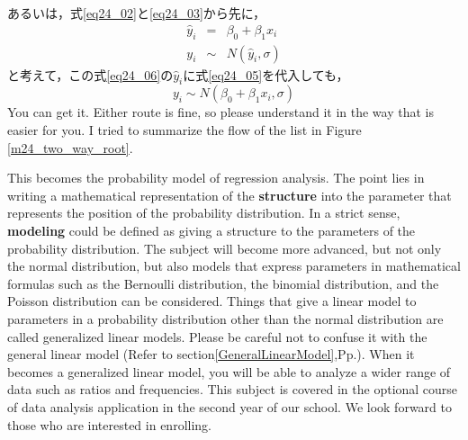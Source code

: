\documentclass{ltjbook}
\begin{document}
あるいは，式\ref{eq24_02}と\ref{eq24_03}から先に，
\begin{eqnarray}
	\hat{y}_i &=& \beta_0 + \beta_1 x_i \label{eq24_05}\\
	y_i &\sim& N(\hat{y}_i,\sigma) \label{eq24_06}
\end{eqnarray}
と考えて，この式\ref{eq24_06}の$\hat{y}_i$に式\ref{eq24_05}を代入しても，
\[ y_i \sim N(\beta_0 + \beta_1x_i, \sigma) \]
You can get it. Either route is fine, so please understand it in the way that is easier for you. I tried to summarize the flow of the list in Figure \ref{m24_two_way_root}.



This becomes the probability model of regression analysis.
The point lies in writing a mathematical representation of the \textbf{structure} into the parameter that represents the position of the probability distribution. In a strict sense, \textbf{modeling} could be defined as giving a structure to the parameters of the probability distribution.
The subject will become more advanced, but not only the normal distribution, but also models that express parameters in mathematical formulas such as the Bernoulli distribution, the binomial distribution, and the Poisson distribution can be considered. Things that give a linear model to parameters in a probability distribution other than the normal distribution are called generalized linear models. Please be careful not to confuse it with the general linear model (Refer to section\ref{GeneralLinearModel},Pp.\pageref{GeneralLinearModel}). When it becomes a generalized linear model, you will be able to analyze a wider range of data such as ratios and frequencies. This subject is covered in the optional course of data analysis application in the second year of our school. We look forward to those who are interested in enrolling.
\end{document}
